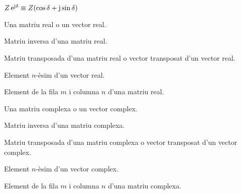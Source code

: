 \begin{list}{}
     $Z\,\eu^{\ju\delta} \equiv Z(\cos\delta+\ju\sin\delta)$
    \item[$\boldsymbol{V}$] Una matriu real o un vector real.
    \item[$\boldsymbol{V}^{-1}$] Matriu inversa d'una matriu real.
    \item[$\transp{\boldsymbol{V}}$] Matriu transposada d'una matriu real o vector
    transposat d'un vector real.
    \item[$\boldsymbol{V}(n)$] Element $n$-\`{e}sim d'un vector real.
    \item[$\boldsymbol{V}(m,n)$] Element de la fila $m$ i columna $n$ d'una matriu real.
    \item[$\mcmplx{V}$] Una matriu complexa o un vector complex.
    \item[$\mcmplx{V}^{-1}$] Matriu inversa d'una matriu complexa.
    \item[\transp{$\mcmplx{V}}$] Matriu transposada d'una matriu complexa o vector
    transposat d'un vector complex.
    \item[$\mcmplx{V}(n)$] Element $n$-\`{e}sim d'un vector complex.
    \item[$\mcmplx{V}(m,n)$] Element de la fila $m$ i columna $n$ d'una matriu complexa.
\end{list}
